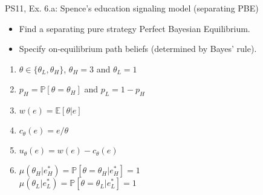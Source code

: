 \begin{frame}{PS11, Ex. 6.a: Spence’s education signaling model (separating PBE)}
    \begin{itemize}
      \item[(a)] Find a separating pure strategy Perfect Bayesian Equilibrium.
    \end{itemize}\vspace{-8pt}
    \begin{multicols}{2}
      \begin{itemize}
        \item[Step 1:] Specify on-equilibrium path beliefs (determined by Bayes' rule).
      \end{itemize}
      \vfill\null\columnbreak
      \begin{enumerate}
        \item[Types:] $\theta\in\{\theta_L,\theta_H\}$, $\theta_H=3$ and $\theta_L=1$
        \item[Prob.:] $p_H=\mathbb{P}[\theta=\theta_H]$ and $p_L=1-p_H$
        \item[Wage:] $w(e)=\mathbb{E}[\theta|e]$
        \item[Cost:] $c_\theta(e)=e/\theta$
        \item[Utility:] $u_\theta(e)=w(e)-c_\theta(e)$
        \item $\mu\left(\theta_H|e_H^*\right)=
               \mathbb{P}\left[\theta=\theta_H|e_H^*\right]=1$\\
              $\mu\left(\theta_L|e_L^*\right)=
               \mathbb{P}\left[\theta=\theta_L|e_L^*\right]=1$
      \end{enumerate}
      \vfill\null
    \end{multicols}
\end{frame}

